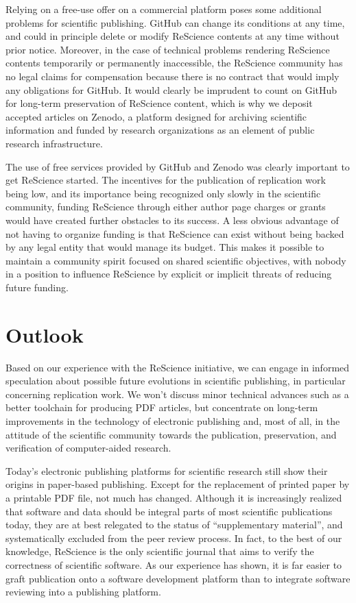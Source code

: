 \documentclass[a4paper,10pt, twocolumn]{article}
\begin{document}
Relying on a free-use offer on a commercial platform poses some
additional problems for scientific publishing. GitHub can change its
conditions at any time, and could in principle delete or modify
ReScience contents at any time without prior notice. Moreover, in the
case of technical problems rendering ReScience contents temporarily or
permanently inaccessible, the ReScience community has no legal claims
for compensation because there is no contract that would imply any
obligations for GitHub. It would clearly be imprudent to count on
GitHub for long-term preservation of ReScience content, which is why
we deposit accepted articles on Zenodo, a platform designed for
archiving scientific information and funded by research organizations
as an element of public research infrastructure.

The use of free services provided by GitHub and Zenodo was clearly
important to get ReScience started. The incentives for the publication
of replication work being low, and its importance being recognized
only slowly in the scientific community, funding ReScience through
either author page charges or grants would have created further
obstacles to its success. A less obvious advantage of not having to
organize funding is that ReScience can exist without being backed by
any legal entity that would manage its budget. This makes it possible
to maintain a community spirit focused on shared scientific
objectives, with nobody in a position to influence ReScience by
explicit or implicit threats of reducing future funding.

\section*{Outlook}

Based on our experience with the ReScience initiative, we can engage
in informed speculation about possible future evolutions in scientific
publishing, in particular concerning replication work. We won't
discuss minor technical advances such as a better toolchain for
producing PDF articles, but concentrate on long-term improvements in
the technology of electronic publishing and, most of all, in the
attitude of the scientific community towards the publication,
preservation, and verification of computer-aided research.


Today's electronic publishing platforms for scientific research still
show their origins in paper-based publishing. Except for the
replacement of printed paper by a printable PDF file, not much has
changed. Although it is increasingly realized that software and data
should be integral parts of most scientific publications today, they
are at best relegated to the status of ``supplementary material'', and
systematically excluded from the peer review process. In fact, to the
best of our knowledge, ReScience is the only scientific journal that
aims to verify the correctness of scientific software. As our
experience has shown, it is far easier to graft publication onto a
software development platform than to integrate software reviewing
into a publishing platform.
\end{document}
